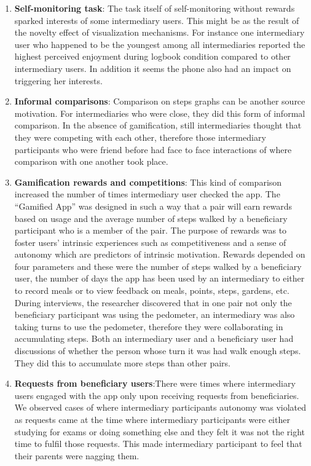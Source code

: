 \documentclass{sig-alternate}
\begin{document}
\begin{enumerate}
\item{\textbf{Self-monitoring task}}: The task itself of self-monitoring without rewards sparked interests of some intermediary users. This might be as the result of the novelty effect of visualization mechanisms. For instance one intermediary user who happened to be the youngest among all intermediaries reported the highest perceived enjoyment during logbook condition compared to other intermediary users. In addition it seems the phone also had an impact on triggering her interests.
\item{\textbf{Informal comparisons}}: Comparison on steps graphs can be another source motivation. For intermediaries who were close, they did this form of informal comparison. In the absence of gamification, still intermediaries thought that they were competing with each other, therefore those intermediary participants who were friend before had face to face interactions of where comparison with one another took place. 
\item{\textbf{Gamification rewards and  competitions}}: This kind of comparison increased the number of times intermediary user checked the app. The ``Gamified App'' was designed in such a way that a pair will earn rewards based on usage and the average number of steps walked by a beneficiary participant who is a member of the pair. The purpose of rewards was to foster users' intrinsic experiences such as competitiveness and a sense of autonomy which are predictors of intrinsic motivation. Rewards depended on four parameters and these were the number of steps walked by a beneficiary user, the number of days the app has been used by an intermediary to either to record meals or to view feedback on meals, points, steps, gardens, etc. During interviews, the researcher discovered that in one pair not only the beneficiary participant was using the pedometer, an intermediary was also taking turns to use the pedometer, therefore they were collaborating in accumulating steps. Both an intermediary user and a beneficiary user had discussions of whether the person whose turn it was had walk enough steps. They did this to accumulate more steps than other pairs.
\item{\textbf{Requests from beneficiary users}}:There were times where intermediary users engaged with the app only upon receiving requests from beneficiaries.  We observed cases of where intermediary participants autonomy was violated as requests came at the time where intermediary participants were either studying for exams or doing something else and they felt it was not the right time to fulfil those requests. This made intermediary participant to feel that their parents were nagging them.
\end{enumerate}
\end{document}
